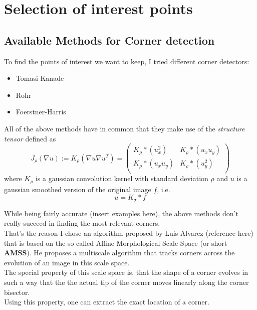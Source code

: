 \chapter{Selection of interest points} %

\label{Chapter1} %


\newcommand{\keyword}[1]{\textbf{#1}}
\newcommand{\tabhead}[1]{\textbf{#1}}
\newcommand{\code}[1]{\texttt{#1}}
\newcommand{\file}[1]{\texttt{\bfseries#1}}
\newcommand{\option}[1]{\texttt{\itshape#1}}

\newcommand{\deriv}[2]{\frac{\partial#1}{\partial#2}}


\section{Available Methods for Corner detection}


To find the points of interest we want to keep, I tried different corner detectors:
\begin{itemize}
    \item Tomasi-Kanade
    \item Rohr
    \item Foerstner-Harris
\end{itemize}


All of the above methods have in common that they make use of the \textit{structure tensor}
defined as
\[
    J_\rho(\nabla u) := K_\rho(\nabla u\nabla u^T) =
    \begin{pmatrix}
        K_\rho * (u_x^2)  & K_\rho * (u_xu_y) \\
        K_\rho * (u_xu_y) & K_\rho * (u_y^2)    \\
    \end{pmatrix}
\]
where $K_\rho$ is a gaussian convolution kernel with standard deviation $\rho$ and $u$ is a gaussian smoothed version of the original image $f$, i.e.
\[
    u = K_\sigma * f
\]

While being fairly accurate (insert examples here), the above methods don't really succeed in finding the most relevant corners. \\
That's the reason I chose an algorithm proposed by Luis Alvarez (reference here) that is based on the so called Affine Morphological Scale Space (or short \textbf{AMSS}).
He proposes a multiscale algorithm that tracks corners across the evolution of an image in this scale space.\\
The special property of this scale space is, that the shape of a corner evolves in such a way that the the actual tip of the corner moves linearly along the corner bisector. \\
Using this property, one can extract the exact location of a corner.


